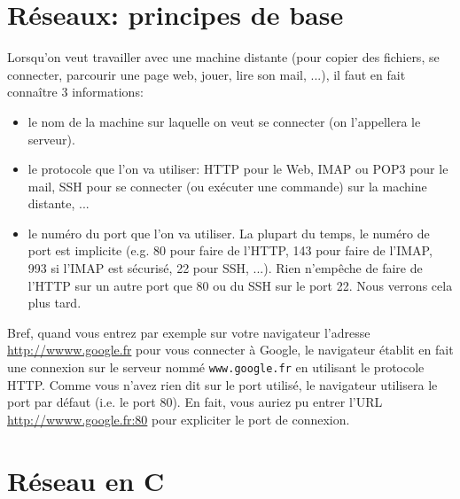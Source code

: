 \documentclass[10pt,a4paper]{article}
\begin{document}
\section*{Réseaux: principes de base}

Lorsqu'on veut travailler avec une machine distante (pour copier des
fichiers, se connecter, parcourir une page web, jouer, lire son mail,
...), il faut en fait connaître 3 informations:
\begin{itemize}
\item le nom de la machine sur laquelle on veut se connecter (on
  l'appellera le serveur).
\item le protocole que l'on va utiliser: HTTP pour le Web, IMAP ou POP3
  pour le mail, SSH pour se connecter (ou exécuter une commande) sur la
  machine distante, ...
\item le numéro du port que l'on va utiliser. La plupart du temps, le
  numéro de port est implicite (e.g. 80 pour faire de l'HTTP, 143 pour
  faire de l'IMAP, 993 si l'IMAP est sécurisé, 22 pour SSH, ...). Rien
  n'empêche de faire de l'HTTP sur un autre port que 80 ou du SSH sur
  le port 22. Nous verrons cela plus tard.
\end{itemize}

Bref, quand vous entrez par exemple sur votre navigateur l'adresse
\url{http://wwww.google.fr} pour vous connecter à Google, le
navigateur établit en fait une connexion sur le serveur nommé
\texttt{www.google.fr} en utilisant le protocole HTTP. Comme vous
n'avez rien dit sur le port utilisé, le navigateur utilisera le port
par défaut (i.e. le port 80).  En fait, vous auriez pu entrer l'URL
\url{http://wwww.google.fr:80} pour expliciter le port de
connexion.


\section*{Réseau en C}
\end{document}
